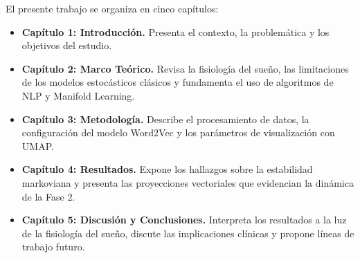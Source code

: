 El presente trabajo se organiza en cinco capítulos:
\begin{itemize}
    \item \textbf{Capítulo 1: Introducción.} Presenta el contexto, la problemática y los objetivos del estudio.
    \item \textbf{Capítulo 2: Marco Teórico.} Revisa la fisiología del sueño, las limitaciones de los modelos estocásticos clásicos y fundamenta el uso de algoritmos de NLP y Manifold Learning.
    \item \textbf{Capítulo 3: Metodología.} Describe el procesamiento de datos, la configuración del modelo Word2Vec y los parámetros de visualización con UMAP.
    \item \textbf{Capítulo 4: Resultados.} Expone los hallazgos sobre la estabilidad markoviana y presenta las proyecciones vectoriales que evidencian la dinámica de la Fase 2.
    \item \textbf{Capítulo 5: Discusión y Conclusiones.} Interpreta los resultados a la luz de la fisiología del sueño, discute las implicaciones clínicas y propone líneas de trabajo futuro.
\end{itemize}
